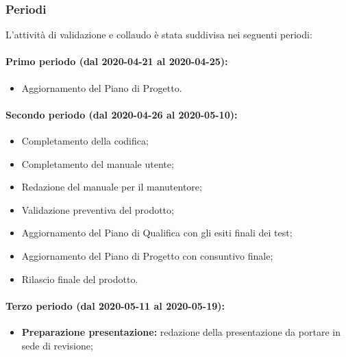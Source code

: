 			\subsubsection{Periodi}
			
				L'attività di validazione e collaudo è stata suddivisa nei seguenti periodi:
		
				\paragraph{Primo periodo (dal 2020-04-21 al 2020-04-25):}
				
					\begin{itemize}
					 	\item Aggiornamento del Piano di Progetto.
					\end{itemize} 	
				
				\paragraph{Secondo periodo (dal 2020-04-26 al 2020-05-10):}
				
					\begin{itemize}
						\item Completamento della codifica;
						\item Completamento del manuale utente;
						\item Redazione del manuale per il manutentore;
						\item Validazione preventiva del prodotto;
						\item Aggiornamento del Piano di Qualifica con gli esiti finali dei test;
						\item Aggiornamento del Piano di Progetto con consuntivo finale;
						\item Rilascio finale del prodotto.
					\end{itemize}
		
				\paragraph{Terzo periodo (dal 2020-05-11 al 2020-05-19):}
				
					\begin{itemize}
						\item \textbf{Preparazione presentazione:} redazione della presentazione da portare in sede di revisione;
					\end{itemize}
	

